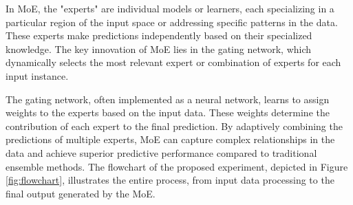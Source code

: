 In MoE, the "experts" are individual models or learners, each specializing in a particular region of the input space or addressing specific patterns in the data. These experts make predictions independently based on their specialized knowledge. The key innovation of MoE lies in the gating network, which dynamically selects the most relevant expert or combination of experts for each input instance.

The gating network, often implemented as a neural network, learns to assign weights to the experts based on the input data. These weights determine the contribution of each expert to the final prediction. By adaptively combining the predictions of multiple experts, MoE can capture complex relationships in the data and achieve superior predictive performance compared to traditional ensemble methods. The flowchart of the proposed experiment, depicted in Figure \ref{fig:flowchart}, illustrates the entire process, from input data processing to the final output generated by the MoE.